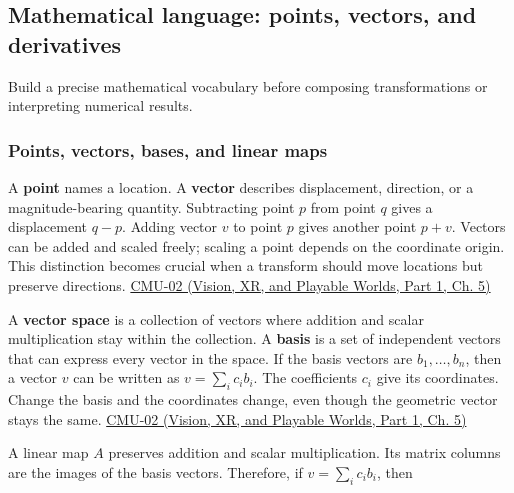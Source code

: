 \subsection{Mathematical language: points, vectors, and derivatives}\label{03-visual-computing-i-ch001-mathematical-language-points-vectors-and-derivatives}

\hypertarget{03-visual-computing-i-ch001-mathematical-language-points-vectors-and-derivatives}{}

Build a precise mathematical vocabulary before composing transformations or interpreting numerical results.

\subsubsection{Points, vectors, bases, and linear maps}\label{03-visual-computing-i-ch001-points-vectors-bases-and-linear-maps}

\hypertarget{03-visual-computing-i-ch001-points-vectors-bases-and-linear-maps}{}

A \textbf{point} names a location. A \textbf{vector} describes displacement, direction, or a magnitude-bearing quantity. Subtracting point \(p\) from point \(q\) gives a displacement \(q-p\). Adding vector \(v\) to point \(p\) gives another point \(p+v\). Vectors can be added and scaled freely; scaling a point depends on the coordinate origin. This distinction becomes crucial when a transform should move locations but preserve directions. \href{../07-Vision-XR-and-Playable-Worlds-P01/main.pdf\#nameddest=04-visual-computing-ii-ch036-cmu-02---linear-algebra-preview}{CMU-02 (Vision, XR, and Playable Worlds, Part 1, Ch. 5)}

A \textbf{vector space} is a collection of vectors where addition and scalar multiplication stay within the collection. A \textbf{basis} is a set of independent vectors that can express every vector in the space. If the basis vectors are \(b_1,\ldots,b_n\), then a vector \(v\) can be written as \(v=\sum_i c_i b_i\). The coefficients \(c_i\) give its coordinates. Change the basis and the coordinates change, even though the geometric vector stays the same. \href{../07-Vision-XR-and-Playable-Worlds-P01/main.pdf\#nameddest=04-visual-computing-ii-ch036-cmu-02---linear-algebra-preview}{CMU-02 (Vision, XR, and Playable Worlds, Part 1, Ch. 5)}

A linear map \(A\) preserves addition and scalar multiplication. Its matrix columns are the images of the basis vectors. Therefore, if \(v=\sum_i c_i b_i\), then

